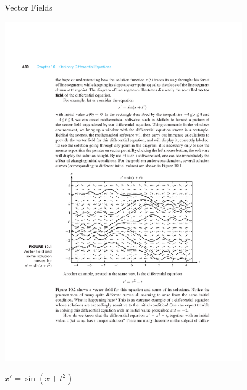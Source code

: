 \documentclass{beamer}
\begin{document}
\begin{frame}{Vector Fields}
\centerline{\includegraphics[width=0.8\textwidth]{Lec13_fig1}}
\begin{center}
$x'=\sin(x+t^2)$
\end{center}
\end{frame}
\end{document}

